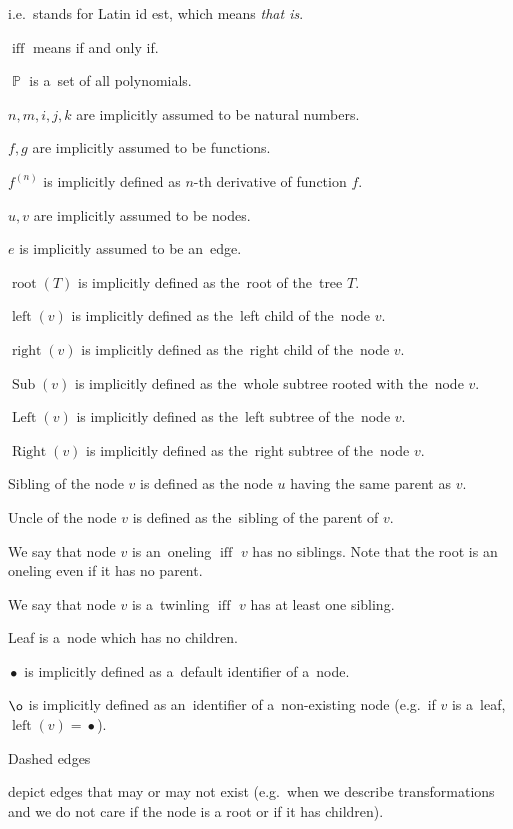 \documentclass[final]{article}
\theoremstyle{definition}
\theoremstyle{definition}
\theoremstyle{remark}
\DeclareMathOperator{\textiff}{\text{iff}}
\DeclareMathOperator{\poly}{\mathbb{P}}
\DeclareMathOperator{\troot}{\text{root}}
\DeclareMathOperator{\tleft}{\text{left}}
\DeclareMathOperator{\tright}{\text{right}}
\DeclareMathOperator{\tLeft}{\text{Left}}
\DeclareMathOperator{\tRight}{\text{Right}}
\DeclareMathOperator{\tSub}{\text{Sub}}
\DeclareMathOperator{\n}{\bullet}
\DeclareMathOperator{\no}{\o}
\begin{document}
i.e.~stands for Latin id est, which means \textit{that is}.

\(\textiff\) means if and only if.

\(\poly\) is a~set of all polynomials.

\(n, m, i, j, k\) are implicitly assumed to be natural numbers.

\(f, g\) are implicitly assumed to be functions.

\(f^{(n)}\) is implicitly defined as \(n\)-th derivative of function \(f\).

\(u, v\) are implicitly assumed to be nodes.

\(e\) is implicitly assumed to be an~edge.

\(\troot(T)\) is implicitly defined as the~root of the~tree \(T\).

\(\tleft(v)\) is implicitly defined as the~left child of the~node \(v\).

\(\tright(v)\) is implicitly defined as the~right child of the~node \(v\).

\(\tSub(v)\) is implicitly defined as the~whole subtree rooted with the~node \(v\).

\(\tLeft(v)\) is implicitly defined as the~left subtree of the~node \(v\).

\(\tRight(v)\) is implicitly defined as the~right subtree of the~node \(v\).

Sibling of the node \(v\) is defined as the node \(u\) having the same parent as \(v\).

Uncle of the node \(v\) is defined as the~sibling of the parent of \(v\).

We say that node \(v\) is an~oneling \(\textiff\) \(v\) has no siblings. Note that the root is an oneling even if it has no parent.

We say that node \(v\) is a~twinling \(\textiff\) \(v\) has at least one sibling.

Leaf is a~node which has no children.

\(\n\) is implicitly defined as a~default identifier of a~node.

\(\no\) is implicitly defined as an~identifier of a~non-existing node (e.g.~if \(v\) is a~leaf, \(\tleft(v) = \n\)).

Dashed edges 
\begin{minipage}{1.5em}

\end{minipage}
depict edges that may or may not exist (e.g.~when we describe transformations and we do not care if the node is a root or if it has children).
\end{document}
